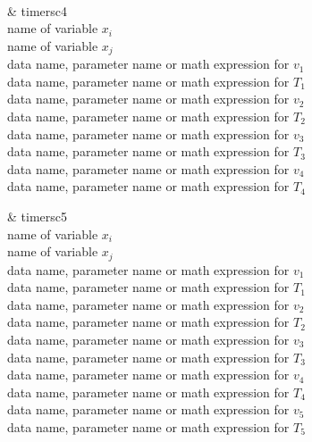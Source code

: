 ~

\hspace*{-8ex}\parbox[t]{100mm}{\sf 
\& timersc4\\
name of variable $x_i$\\
name of variable $x_j$\\
data name, parameter name or math expression for $v_1$\\
data name, parameter name or math expression for $T_1$\\
data name, parameter name or math expression for $v_2$\\
data name, parameter name or math expression for $T_2$\\
data name, parameter name or math expression for $v_3$\\
data name, parameter name or math expression for $T_3$\\
data name, parameter name or math expression for $v_4$\\
data name, parameter name or math expression for $T_4$
}\parbox[t]{95mm}{\sf 
\& timersc5\\
name of variable $x_i$\\
name of variable $x_j$\\
data name, parameter name or math expression for $v_1$\\
data name, parameter name or math expression for $T_1$\\
data name, parameter name or math expression for $v_2$\\
data name, parameter name or math expression for $T_2$\\
data name, parameter name or math expression for $v_3$\\
data name, parameter name or math expression for $T_3$\\
data name, parameter name or math expression for $v_4$\\
data name, parameter name or math expression for $T_4$\\
data name, parameter name or math expression for $v_5$\\
data name, parameter name or math expression for $T_5$
}

~

